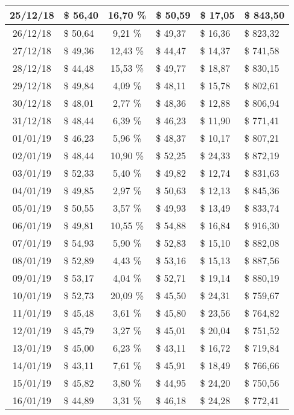 \begin{center}
\begin{small}
\begin{longtable}{|c|l|c|l|l|l|}
25/12/18 & \$ 56,40 & 16,70 \% & \$ 50,59 & \$ 17,05 & \$ 843,50 \\ \hline
26/12/18 & \$ 50,64 & 9,21 \% & \$ 49,37 & \$ 16,36 & \$ 823,32 \\ \hline
27/12/18 & \$ 49,36 & 12,43 \% & \$ 44,47 & \$ 14,37 & \$ 741,58 \\ \hline
28/12/18 & \$ 44,48 & 15,53 \% & \$ 49,77 & \$ 18,87 & \$ 830,15 \\ \hline
29/12/18 & \$ 49,84 & 4,09 \% & \$ 48,11 & \$ 15,78 & \$ 802,61 \\ \hline
30/12/18 & \$ 48,01 & 2,77 \% & \$ 48,36 & \$ 12,88 & \$ 806,94 \\ \hline
31/12/18 & \$ 48,44 & 6,39 \% & \$ 46,23 & \$ 11,90 & \$ 771,41 \\ \hline
01/01/19 & \$ 46,23 & 5,96 \% & \$ 48,37 & \$ 10,17 & \$ 807,21 \\ \hline
02/01/19 & \$ 48,44 & 10,90 \% & \$ 52,25 & \$ 24,33 & \$ 872,19 \\ \hline
03/01/19 & \$ 52,33 & 5,40 \% & \$ 49,82 & \$ 12,74 & \$ 831,63 \\ \hline
04/01/19 & \$ 49,85 & 2,97 \% & \$ 50,63 & \$ 12,13 & \$ 845,36 \\ \hline
05/01/19 & \$ 50,55 & 3,57 \% & \$ 49,93 & \$ 13,49 & \$ 833,74 \\ \hline
06/01/19 & \$ 49,81 & 10,55 \% & \$ 54,88 & \$ 16,84 & \$ 916,30 \\ \hline
07/01/19 & \$ 54,93 & 5,90 \% & \$ 52,83 & \$ 15,10 & \$ 882,08 \\ \hline
08/01/19 & \$ 52,89 & 4,43 \% & \$ 53,16 & \$ 15,13 & \$ 887,56 \\ \hline
09/01/19 & \$ 53,17 & 4,04 \% & \$ 52,71 & \$ 19,14 & \$ 880,19 \\ \hline
10/01/19 & \$ 52,73 & 20,09 \% & \$ 45,50 & \$ 24,31 & \$ 759,67 \\ \hline
11/01/19 & \$ 45,48 & 3,61 \% & \$ 45,80 & \$ 23,56 & \$ 764,82 \\ \hline
12/01/19 & \$ 45,79 & 3,27 \% & \$ 45,01 & \$ 20,04 & \$ 751,52 \\ \hline
13/01/19 & \$ 45,00 & 6,23 \% & \$ 43,11 & \$ 16,72 & \$ 719,84 \\ \hline
14/01/19 & \$ 43,11 & 7,61 \% & \$ 45,91 & \$ 18,49 & \$ 766,66 \\ \hline
15/01/19 & \$ 45,82 & 3,80 \% & \$ 44,95 & \$ 24,20 & \$ 750,56 \\ \hline
16/01/19 & \$ 44,89 & 3,31 \% & \$ 46,18 & \$ 24,28 & \$ 772,41 \\ \hline

\end{longtable}
\end{small}
\end{center}
